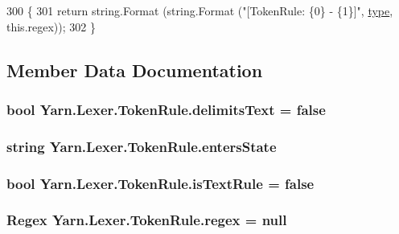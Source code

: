 \begin{DoxyCode}
300             \{
301                 \textcolor{keywordflow}{return} string.Format (string.Format (\textcolor{stringliteral}{"[TokenRule: \{0\} - \{1\}]"}, 
      \hyperlink{a00150_a0de6fac3b55cf0c61e07cea53ce67caa}{type}, this.regex));
302             \}
\end{DoxyCode}


\subsection{Member Data Documentation}
\hypertarget{a00150_ab0849136a1f27b4d13cb7a45e2fe7130}{
\subsubsection[{delimits\-Text}]{\setlength{\rightskip}{0pt plus 5cm}bool Yarn.\-Lexer.\-Token\-Rule.\-delimits\-Text = false}}\label{a00150_ab0849136a1f27b4d13cb7a45e2fe7130}
\hypertarget{a00150_af6a4bd3416c4e1b8e56f9db461d52d18}{
\subsubsection[{enters\-State}]{\setlength{\rightskip}{0pt plus 5cm}string Yarn.\-Lexer.\-Token\-Rule.\-enters\-State}}\label{a00150_af6a4bd3416c4e1b8e56f9db461d52d18}
\hypertarget{a00150_a09f49e6edf9ace38a92d723998181f8f}{
\subsubsection[{is\-Text\-Rule}]{\setlength{\rightskip}{0pt plus 5cm}bool Yarn.\-Lexer.\-Token\-Rule.\-is\-Text\-Rule = false}}\label{a00150_a09f49e6edf9ace38a92d723998181f8f}
\hypertarget{a00150_a47a404d6637fae489c3c77729a01cc69}{
\subsubsection[{regex}]{\setlength{\rightskip}{0pt plus 5cm}Regex Yarn.\-Lexer.\-Token\-Rule.\-regex = null}}\label{a00150_a47a404d6637fae489c3c77729a01cc69}
